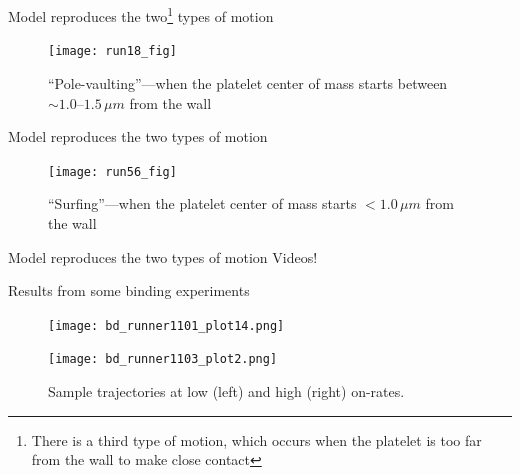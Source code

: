 \documentclass[10pt]{beamer}
\begin{document}
\begin{frame}{Model reproduces the two\footnote{There is a third type
      of motion, which occurs when the platelet is too far from the
      wall to make close contact} types of motion}

  \begin{figure}
    \centering
    \texttt{[image: run18\_fig]}
    \caption{``Pole-vaulting''---when the platelet center of mass
      starts between $\sim 1.0$--$1.5 \, \mu m$ from the wall}
    \label{fig:free-rolling}
  \end{figure}
\end{frame}

\begin{frame}{Model reproduces the two types of motion}
  \begin{figure}
    \centering
    \texttt{[image: run56\_fig]}
    \caption{``Surfing''---when the platelet center of mass starts $<
      1.0 \, \mu m$ from the wall} 
    \label{fig:free-rolling}
  \end{figure}
\end{frame}

\begin{frame}{Model reproduces the two types of motion}
  Videos!
\end{frame}

\begin{frame}{Results from some binding experiments}


  \begin{figure}
    \centering
    \parbox{0.49\textwidth}{
      \texttt{[image: bd\_runner1101\_plot14.png]}
    }
    \hfill
    \parbox{0.49\textwidth}{
      \texttt{[image: bd\_runner1103\_plot2.png]}
    }
    \caption{Sample trajectories at low (left) and high (right)
      on-rates.}
    \label{fig:sample-trajectories}
  \end{figure}
\end{frame}
\end{document}
